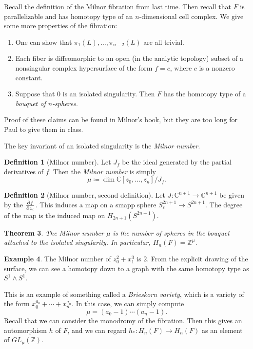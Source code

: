 \documentclass[leqno, openany]{memoir}
\newtheorem{thm}{Theorem}[chapter]
\theoremstyle{definition}
\newtheorem{defn}[thm]{Definition}
\newtheorem{exm}[thm]{Example}
\theoremstyle{remark}
\theoremstyle{plain}
\theoremstyle{definition}
\theoremstyle{remark}
\newcommand{\C}{\mathbb{C}}
\newcommand{\Z}{\mathbb{Z}}
\newcommand{\ep}{\varepsilon}
\begin{document}
Recall the definition of the Milnor fibration from last time. Then recall that $F$ is parallelizable and has homotopy type of an $n$-dimensional cell complex.
We give some more properties of the fibration:
\begin{enumerate}
    \item One can show that $\pi_1(L), \ldots, \pi_{n-2}(L)$ are all trivial.
    \item Each fiber is diffeomorphic to an open (in the analytic topology) subset of a nonsingular complex hypersurface of the form $f = c$, where $c$ is a nonzero constant.
    \item Suppose that $0$ is an isolated singularity. Then $F$ has the homotopy type of a \textit{bouquet of $n$-spheres}.
\end{enumerate}
Proof of these claims can be found in Milnor's book, but they are too long for Paul to give them in class.

The key invariant of an isolated singularity is the \textit{Milnor number}.
\begin{defn}[Milnor number]
    Let $J_f$ be the ideal generated by the partial derivatives of $f$. Then the \textit{Milnor number} is simply
    \[ \mu \coloneqq \dim \C[z_0, \ldots, z_n]/J_f. \]
\end{defn}

\begin{defn}[Milnor number, second definition]
    Let $J: \C^{n+1} \to \C^{n+1}$ be given by the $\pdv{f}{z_i}$. This induces a map on a smapp sphere $S_{\ep}^{2n+1} \to S^{2n+1}$. The degree of the map is the induced map on $H_{2n+1}(S^{2n+1})$.
\end{defn}

\begin{thm}
    The Milnor number $\mu$ is the number of spheres in the bouquet attached to the isolated singularity. In particular, $H_n(F) = \Z^{\mu}$.
\end{thm}

\begin{exm}
    The Milnor number of $z_0^2 + x_1^3$ is $2$. From the explicit drawing of the surface, we can see a homotopy down to a graph with the same homotopy type as $S^1 \wedge S^1$.
\end{exm}

This is an example of something called a \textit{Brieskorn variety}, which is a variety of the form $x_0^{a_0} + \cdots + x_n^{a_n}$. In this case, we can simply compute
\[ \mu = (a_0 - 1) \cdots (a_n - 1). \]
Recall that we can consider the monodromy of the fibration. Then this gives an automorphism $h$ of $F$, and we can regard $h_*: H_n(F) \to H_n(F)$ as an element of $GL_{\mu}(\Z)$.
\end{document}
